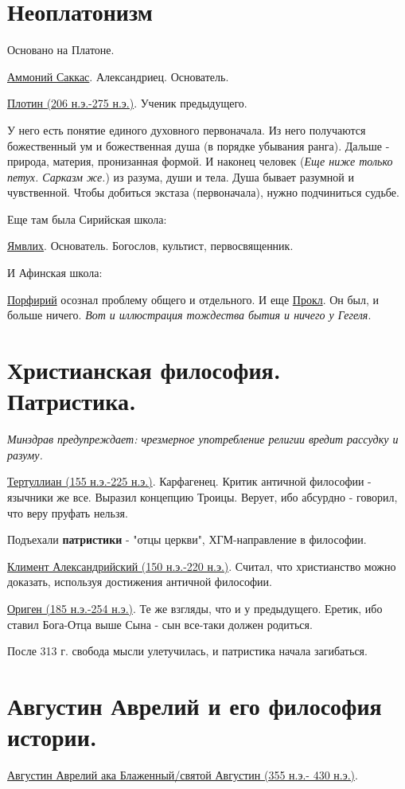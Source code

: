 \section{Неоплатонизм}

Основано на Платоне.

\underline{Аммоний Саккас}. Александриец. Основатель.

\underline{Плотин (206 н.э.-275 н.э.)}. Ученик предыдущего. 

У него есть понятие единого духовного первоначала. Из него получаются божественный ум и божественная душа (в порядке убывания ранга).  Дальше - природа, материя, пронизанная формой. И наконец человек (\textit{Еще ниже только петух. Сарказм же.}) из разума, души и тела. Душа бывает разумной и чувственной. Чтобы добиться экстаза (первоначала), нужно подчиниться судьбе.

Еще там была Сирийская школа:

\underline{Ямвлих}. Основатель. Богослов, культист, первосвященник. 

И Афинская школа:

\underline{Порфирий} осознал проблему общего и отдельного. И еще \underline{Прокл}. Он был, и больше ничего. \textit{Вот и иллюстрация тождества бытия и ничего у Гегеля}.


\section{Христианская философия. Патристика.}
\textit{Минздрав предупреждает: чрезмерное употребление религии вредит рассудку и разуму.}

\underline{Тертуллиан (155 н.э.-225 н.э.)}. Карфагенец. Критик античной философии - язычники же все. Выразил концепцию Троицы. Верует, ибо абсурдно - говорил, что веру пруфать нельзя. 

Подъехали \textbf{патристики} - "отцы церкви", ХГМ-направление в философии.

\underline{Климент Александрийский (150 н.э.-220 н.э.)}. Считал, что христианство можно доказать, используя достижения античной философии.

\underline{Ориген (185 н.э.-254 н.э.)}. Те же взгляды, что и у предыдущего. Еретик, ибо ставил Бога-Отца выше Сына - сын все-таки должен родиться.
 
После 313 г. свобода мысли улетучилась, и патристика начала загибаться.

\section{Августин Аврелий и его философия истории.}
\underline{Августин Аврелий ака Блаженный/святой Августин (355 н.э.- 430 н.э.)}. 

